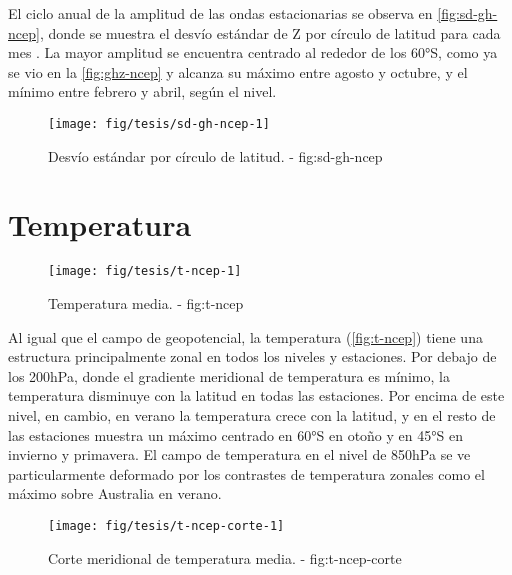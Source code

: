 \documentclass[spanish,a4paper]{book}
\begin{document}
El ciclo anual de la amplitud de las ondas estacionarias se observa en
\autoref{fig:sd-gh-ncep}, donde se muestra el desvío estándar de Z por
círculo de latitud para cada mes
. La
mayor amplitud se encuentra centrado al rededor de los 60°S, como ya se
vio en la \autoref{fig:ghz-ncep} y alcanza su máximo entre agosto y
octubre, y el mínimo entre febrero y abril, según el nivel.

\begin{figure}

{\centering \texttt{[image: fig/tesis/sd-gh-ncep-1]} 

}

\caption{Desvío estándar por círculo de latitud. - fig:sd-gh-ncep}\label{fig:sd-gh-ncep}
\end{figure}

\section{Temperatura}\label{temperatura}

\begin{landscape}\begin{figure}

{\centering \texttt{[image: fig/tesis/t-ncep-1]} 

}

\caption{Temperatura media. - fig:t-ncep}\label{fig:t-ncep}
\end{figure}
\end{landscape}

Al igual que el campo de geopotencial, la temperatura
(\autoref{fig:t-ncep}) tiene una estructura principalmente zonal en
todos los niveles y estaciones. Por debajo de los 200hPa, donde el
gradiente meridional de temperatura es mínimo, la temperatura disminuye
con la latitud en todas las estaciones. Por encima de este nivel, en
cambio, en verano la temperatura crece con la latitud, y en el resto de
las estaciones muestra un máximo centrado en 60°S en otoño y en 45°S en
invierno y primavera. El campo de temperatura en el nivel de 850hPa se
ve particularmente deformado por los contrastes de temperatura zonales
como el máximo sobre Australia en verano.

\begin{figure}

{\centering \texttt{[image: fig/tesis/t-ncep-corte-1]} 

}

\caption{Corte meridional de temperatura media. - fig:t-ncep-corte}\label{fig:t-ncep-corte}
\end{figure}
\end{document}
